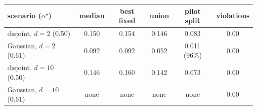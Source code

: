 \begin{tabular}{lccccc}
\toprule
scenario ($\alpha^\star$) & median & best fixed & union & pilot split & violations \\
\midrule
disjoint, $d=2$ (0.50) & 0.150 & 0.154 & 0.146 & 0.083 & 0.00 \\
Gaussian, $d=2$ (0.61) & 0.092 & 0.092 & 0.052 & 0.011 (96\%) & 0.00 \\
disjoint, $d=10$ (0.50) & 0.146 & 0.160 & 0.142 & 0.073 & 0.00 \\
Gaussian, $d=10$ (0.61) & none & none & none & none & 0.00 \\
\bottomrule
\end{tabular}
